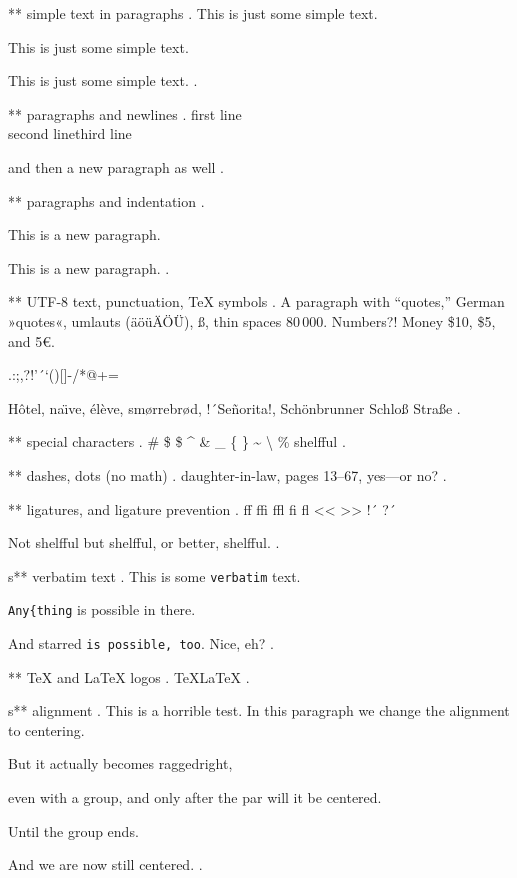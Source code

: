 ** simple text in paragraphs
.
This is just some simple text.

This is just some simple text.

This is just some simple text.
.


** paragraphs and newlines
.
first line\\second line\newline third line\par and then a new paragraph as well
.


** paragraphs and indentation
.
\noindent

\noindent

This is a new paragraph.

\noindent
This is a new paragraph.
.


** UTF-8 text, punctuation, TeX symbols
.
A para\-graph with “quotes,” German »quotes«, umlauts (äöüÄÖÜ), ß, thin spaces 80\,000. Numbers?! Money \$10, \$5, and 5€.

.:;,?!'´`()[]-/*@+=

H\^otel, na\"\i ve, \'el\`eve, sm\o rrebr\o d, !´Se\~norita!, Sch\"onbrunner Schlo\ss{} Stra\ss e
.


** special characters
.
\# \$ \$ \^{} \& \_ \{ \} \~{} \textbackslash{} \% shelf\-ful
.


** dashes, dots (no math)
.
daughter-in-law, pages 13--67, yes---or no?
.


** ligatures, and ligature prevention
.
ff ffi ffl fi fl << >> !´ ?´

Not shelfful but shelf\mbox{}ful, or better, shelf\/ful.
.


s** verbatim text
.
This is some \verb|verbatim| text.

\verb/Any{thing/ is possible in there.

And starred \verb*-is possible, too-. Nice, eh?
.


** TeX and LaTeX logos
.
\TeX \LaTeX
.


s** alignment
.
This is a horrible test.
\centering
In this paragraph we change the alignment to centering.
{\raggedright But it actually becomes raggedright,

even with a group, and only after the par will it be centered.}
Until the group ends.

And we are now still centered.
.
